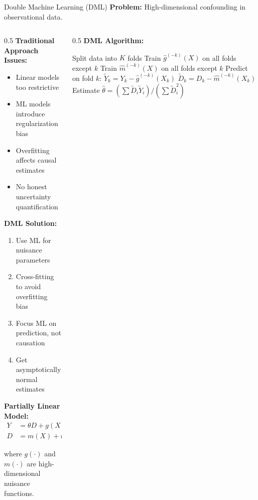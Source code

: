 \documentclass[aspectratio=169,11pt]{beamer}
\begin{document}
\begin{frame}{Double Machine Learning (DML)}
\textbf{Problem:} High-dimensional confounding in observational data.

\begin{columns}
\begin{column}{0.5\textwidth}
\textbf{Traditional Approach Issues:}
\begin{itemize}
\item Linear models too restrictive
\item ML models introduce regularization bias
\item Overfitting affects causal estimates
\item No honest uncertainty quantification
\end{itemize}

\vspace{0.3cm}
\textbf{DML Solution:}
\begin{enumerate}
\item Use ML for nuisance parameters
\item Cross-fitting to avoid overfitting bias
\item Focus ML on prediction, not causation
\item Get asymptotically normal estimates
\end{enumerate}

\vspace{0.3cm}
\textbf{Partially Linear Model:}
\begin{align}
Y &= \theta D + g(X) + \epsilon\\
D &= m(X) + \eta
\end{align}

where $g(\cdot)$ and $m(\cdot)$ are high-dimensional nuisance functions.
\end{column}
\begin{column}{0.5\textwidth}
\textbf{DML Algorithm:}

\begin{algorithm}[H]
\caption{Double Machine Learning}
\begin{algorithmic}[1]
\STATE Split data into $K$ folds
\STATE Train $\hat{g}^{(-k)}(X)$ on all folds except $k$
\STATE Train $\hat{m}^{(-k)}(X)$ on all folds except $k$
\STATE Predict on fold $k$:
\STATE \quad $\tilde{Y}_k = Y_k - \hat{g}^{(-k)}(X_k)$
\STATE \quad $\tilde{D}_k = D_k - \hat{m}^{(-k)}(X_k)$
\ENDFOR
\STATE Estimate $\hat{\theta} = (\sum \tilde{D}_i \tilde{Y}_i) / (\sum \tilde{D}_i^2)$
\end{algorithmic}
\end{algorithm}


\end{column}
\end{columns}
\end{frame}
\end{document}
